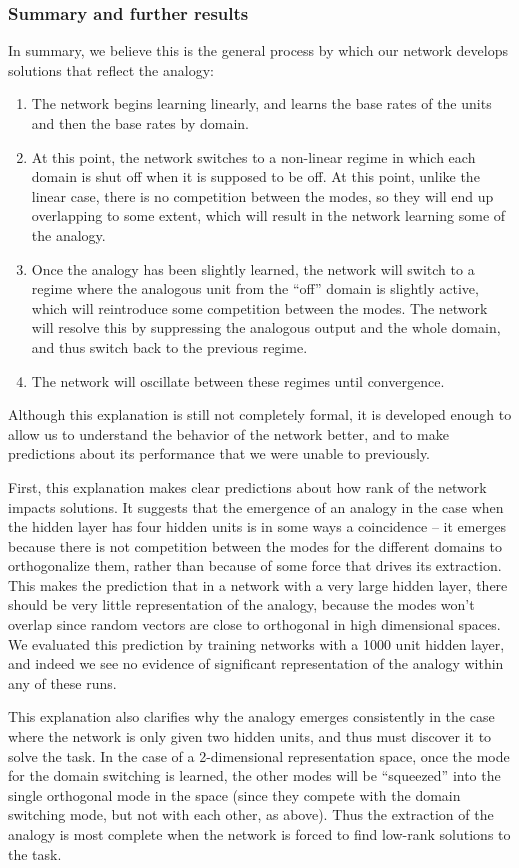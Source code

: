 \documentclass[11pt]{article}
\begin{document}
\subsubsection{Summary and further results}
In summary, we believe this is the general process by which our network develops solutions that reflect the analogy:
\begin{enumerate}
\item The network begins learning linearly, and learns the base rates of the units and then the base rates by domain. 
\item At this point, the network switches to a non-linear regime in which each domain is shut off when it is supposed to be off. At this point, unlike the linear case, there is no competition between the modes, so they will end up overlapping to some extent, which will result in the network learning some of the analogy. 
\item Once the analogy has been slightly learned, the network will switch to a regime where the analogous unit from the ``off'' domain is slightly active, which will reintroduce some competition between the modes. The network will resolve this by suppressing the analogous output and the whole domain, and thus switch back to the previous regime.
\item The network will oscillate between these regimes until convergence.
\end{enumerate}
Although this explanation is still not completely formal, it is developed enough to allow us to understand the behavior of the network better, and to make predictions about its performance that we were unable to previously.\par
First, this explanation makes clear predictions about how rank of the network impacts solutions. It suggests that the emergence of an analogy in the case when the hidden layer has four hidden units is in some ways a coincidence -- it emerges because there is not competition between the modes for the different domains to orthogonalize them, rather than because of some force that drives its extraction. This makes the prediction that in a network with a very large hidden layer, there should be very little representation of the analogy, because the modes won't overlap since random vectors are close to orthogonal in high dimensional spaces. We evaluated this prediction by training networks with a 1000 unit hidden layer, and indeed we see no evidence of significant representation of the analogy within any of these runs. \par
This explanation also clarifies why the analogy emerges consistently in the case where the network is only given two hidden units, and thus must discover it to solve the task. In the case of a 2-dimensional representation space, once the mode for the domain switching is learned, the other modes will be ``squeezed'' into the single orthogonal mode in the space (since they compete with the domain switching mode, but not with each other, as above). Thus the extraction of the analogy is most complete when the network is forced to find low-rank solutions to the task.\par
\end{document}
